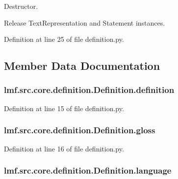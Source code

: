 Destructor. 

Release Text\+Representation and Statement instances. 

Definition at line 25 of file definition.\+py.



\subsection{Member Data Documentation}
\hypertarget{classlmf_1_1src_1_1core_1_1definition_1_1_definition_a11eb38a77e7ad1f45616f1bbdc1f94b2}{
\subsubsection[{definition}]{\setlength{\rightskip}{0pt plus 5cm}lmf.\+src.\+core.\+definition.\+Definition.\+definition}}\label{classlmf_1_1src_1_1core_1_1definition_1_1_definition_a11eb38a77e7ad1f45616f1bbdc1f94b2}


Definition at line 15 of file definition.\+py.

\hypertarget{classlmf_1_1src_1_1core_1_1definition_1_1_definition_a2ea669abd12794b2603c5cc4ea6ce45a}{
\subsubsection[{gloss}]{\setlength{\rightskip}{0pt plus 5cm}lmf.\+src.\+core.\+definition.\+Definition.\+gloss}}\label{classlmf_1_1src_1_1core_1_1definition_1_1_definition_a2ea669abd12794b2603c5cc4ea6ce45a}


Definition at line 16 of file definition.\+py.

\hypertarget{classlmf_1_1src_1_1core_1_1definition_1_1_definition_aa4893a308e8f09a596edb8d7ad510a9f}{
\subsubsection[{language}]{\setlength{\rightskip}{0pt plus 5cm}lmf.\+src.\+core.\+definition.\+Definition.\+language}}\label{classlmf_1_1src_1_1core_1_1definition_1_1_definition_aa4893a308e8f09a596edb8d7ad510a9f}


